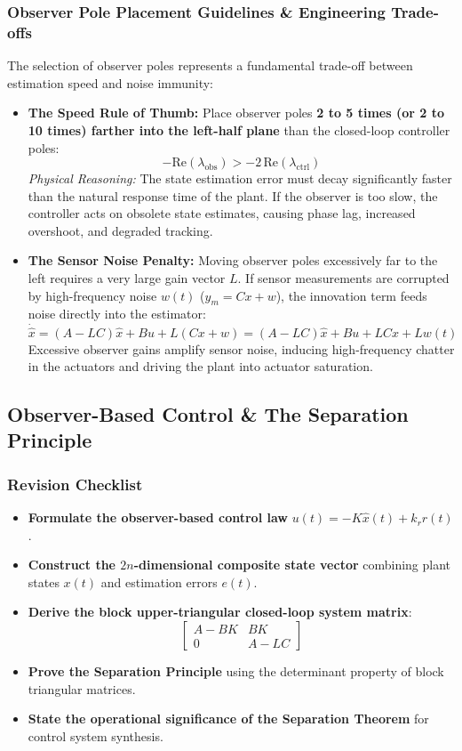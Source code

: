 \documentclass[12pt,onecolumn,twoside ]{article}
\begin{document}
	\subsubsection{Observer Pole Placement Guidelines \& Engineering Trade-offs}
	The selection of observer poles represents a fundamental trade-off between estimation speed and noise immunity:
	\begin{itemize}
		\item
		\textbf{The Speed Rule of Thumb:} Place observer poles \textbf{2 to 5 times (or 2 to 10 times) farther into the left-half plane} than the closed-loop controller poles: \[
		-\text{Re}(\lambda_{\text{obs}}) > -2\,\text{Re}(\lambda_{\text{ctrl}})
		\] \textit{Physical Reasoning:} The state estimation error must decay significantly faster than the natural response time of the plant. If the observer is too slow, the controller acts on obsolete state estimates, causing phase lag, increased overshoot, and degraded tracking.
		\item
		\textbf{The Sensor Noise Penalty:} Moving observer poles excessively far to the left requires a very large gain vector $L$. If sensor measurements are corrupted by high-frequency noise $w(t)$ ($y_m = Cx + w$), the innovation term feeds noise directly into the estimator: \[
		\dot{\hat{x}} = (A - LC)\hat{x} + Bu + L(Cx + w) = (A - LC)\hat{x} + Bu + LCx + Lw(t)
		\] Excessive observer gains amplify sensor noise, inducing high-frequency chatter in the actuators and driving the plant into actuator saturation.
	\end{itemize}
	
	\subsection{Observer-Based Control \& The Separation Principle}
	\subsubsection{Revision Checklist}
	\begin{itemize}
		\item[$\square$]
		\textbf{Formulate the observer-based control law} $u(t) = -K\hat{x}(t) + k_r r(t)$.
		\item[$\square$]
		\textbf{Construct the $2n$-dimensional composite state vector} combining plant states $x(t)$ and estimation errors $e(t)$.
		\item[$\square$]
		\textbf{Derive the block upper-triangular closed-loop system matrix}: \[
		\begin{bmatrix} A - BK & BK \\ 0 & A - LC \end{bmatrix}
		\]
		\item[$\square$]
		\textbf{Prove the Separation Principle} using the determinant property of block triangular matrices.
		\item[$\square$]
		\textbf{State the operational significance of the Separation Theorem} for control system synthesis.
	\end{itemize}
	
\end{document}

